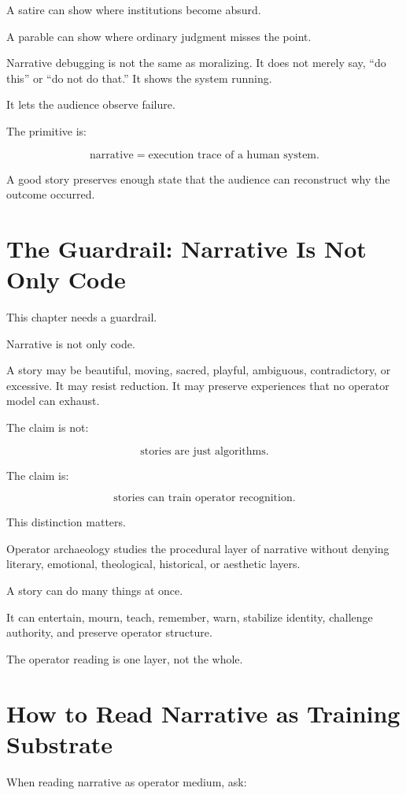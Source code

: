 \documentclass[11pt]{book}
\begin{document}
A satire can show where institutions become absurd.

A parable can show where ordinary judgment misses the point.

Narrative debugging is not the same as moralizing. It does not merely say, ``do this'' or ``do not do that.'' It shows the system running.

It lets the audience observe failure.

The primitive is:

\[
\text{narrative} = \text{execution trace of a human system}.
\]

A good story preserves enough state that the audience can reconstruct why the outcome occurred.

\section{The Guardrail: Narrative Is Not Only Code}

This chapter needs a guardrail.

Narrative is not only code.

A story may be beautiful, moving, sacred, playful, ambiguous, contradictory, or excessive. It may resist reduction. It may preserve experiences that no operator model can exhaust.

The claim is not:

\[
\text{stories are just algorithms}.
\]

The claim is:

\[
\text{stories can train operator recognition}.
\]

This distinction matters.

Operator archaeology studies the procedural layer of narrative without denying literary, emotional, theological, historical, or aesthetic layers.

A story can do many things at once.

It can entertain, mourn, teach, remember, warn, stabilize identity, challenge authority, and preserve operator structure.

The operator reading is one layer, not the whole.

\section{How to Read Narrative as Training Substrate}

When reading narrative as operator medium, ask:
\end{document}
